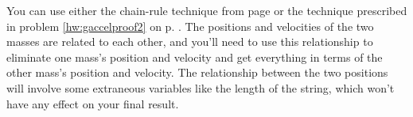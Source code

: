 You can use either
the chain-rule technique from page  \pageref{gaccelproof} or the technique prescribed
in problem \ref{hw:gaccelproof2} on p. \pageref{hw:gaccelproof2}. The
positions and velocities of the two masses are related to each other, and you'll need
to use this relationship to eliminate one mass's position and velocity and get everything
in terms of the other mass's position and velocity. The relationship between the
two positions will involve some extraneous variables like the length of the string,
which won't have any effect on your final result.
